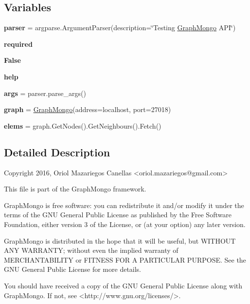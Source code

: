 \subsection*{Variables}
\begin{DoxyCompactItemize}
\item 
\hypertarget{namespacegraphmongo_ab24c01e2ec223f8eff12287ef0940395}{}\label{namespacegraphmongo_ab24c01e2ec223f8eff12287ef0940395} 
{\bfseries parser} = argparse.\+Argument\+Parser(description=\char`\"{}Testing \hyperlink{classgraphmongo_1_1GraphMongo}{Graph\+Mongo} A\+PI\char`\"{})
\item 
\hypertarget{namespacegraphmongo_a697548046ee5b3292f3a1d4a64bdaa45}{}\label{namespacegraphmongo_a697548046ee5b3292f3a1d4a64bdaa45} 
{\bfseries required}
\item 
\hypertarget{namespacegraphmongo_a064485cb9d93569d342f20d33dd3ad52}{}\label{namespacegraphmongo_a064485cb9d93569d342f20d33dd3ad52} 
{\bfseries False}
\item 
\hypertarget{namespacegraphmongo_a9c92856e72bedfc8679568f66da1a335}{}\label{namespacegraphmongo_a9c92856e72bedfc8679568f66da1a335} 
{\bfseries help}
\item 
\hypertarget{namespacegraphmongo_a876a0120dd69b70c209a34661ea63ae4}{}\label{namespacegraphmongo_a876a0120dd69b70c209a34661ea63ae4} 
{\bfseries args} = parser.\+parse\+\_\+args()
\item 
\hypertarget{namespacegraphmongo_aac9de70b22072a15d613fb102198ac39}{}\label{namespacegraphmongo_aac9de70b22072a15d613fb102198ac39} 
{\bfseries graph} = \hyperlink{classgraphmongo_1_1GraphMongo}{Graph\+Mongo}(address=\textquotesingle{}localhost\textquotesingle{}, port=27018)
\item 
\hypertarget{namespacegraphmongo_a6ff4e4c73d73e9a679c164b7acb3cb97}{}\label{namespacegraphmongo_a6ff4e4c73d73e9a679c164b7acb3cb97} 
{\bfseries elems} = graph.\+Get\+Nodes().Get\+Neighbours().Fetch()
\end{DoxyCompactItemize}


\subsection{Detailed Description}
\begin{DoxyVerb}Copyright 2016, Oriol Mazariegos Canellas <oriol.mazariegos@gmail.com> 
 
This file is part of the GraphMongo framework.

GraphMongo is free software: you can redistribute it and/or modify
it under the terms of the GNU General Public License as published by
the Free Software Foundation, either version 3 of the License, or
(at your option) any later version.

GraphMongo is distributed in the hope that it will be useful,
but WITHOUT ANY WARRANTY; without even the implied warranty of
MERCHANTABILITY or FITNESS FOR A PARTICULAR PURPOSE.  See the
GNU General Public License for more details.

You should have received a copy of the GNU General Public License
along with GraphMongo.  If not, see <http://www.gnu.org/licenses/>.
\end{DoxyVerb}
 